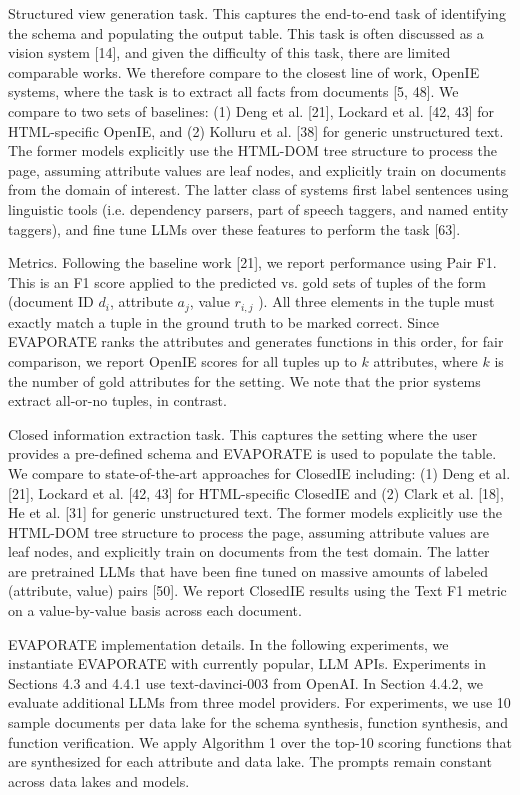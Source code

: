 \documentclass[10pt]{article}
\begin{document}
Structured view generation task. This captures the end-to-end task of identifying the schema and populating the output table. This task is often discussed as a vision system [14], and given the difficulty of this task, there are limited comparable works. We therefore compare to the closest line of work, OpenIE systems, where the task is to extract all facts from documents [5, 48]. We compare to two sets of baselines: (1) Deng et al. [21], Lockard et al. [42, 43] for HTML-specific OpenIE, and (2) Kolluru et al. [38] for generic unstructured text. The former models explicitly use the HTML-DOM tree structure to process the page, assuming attribute values are leaf nodes, and explicitly train on documents from the domain of interest. The latter class of systems first label sentences using linguistic tools (i.e. dependency parsers, part of speech taggers, and named entity taggers), and fine tune LLMs over these features to perform the task [63].

Metrics. Following the baseline work [21], we report performance using Pair F1. This is an F1 score applied to the predicted vs. gold sets of tuples of the form (document ID $d_{i}$, attribute $a_{j}$, value $r_{i, j}$ ). All three elements in the tuple must exactly match a tuple in the ground truth to be marked correct. Since EVAPORATE ranks the attributes and generates functions in this order, for fair comparison, we report OpenIE scores for all tuples up to $k$ attributes, where $k$ is the number of gold attributes for the setting. We note that the prior systems extract all-or-no tuples, in contrast.

Closed information extraction task. This captures the setting where the user provides a pre-defined schema and EVAPORATE is used to populate the table. We compare to state-of-the-art approaches for ClosedIE including: (1) Deng et al. [21], Lockard et al. [42, 43] for HTML-specific ClosedIE and (2) Clark et al. [18], He et al. [31] for generic unstructured text. The former models explicitly use the HTML-DOM tree structure to process the page, assuming attribute values are leaf nodes, and explicitly train on documents from the test domain. The latter are pretrained LLMs that have been fine tuned on massive amounts of labeled (attribute, value) pairs [50]. We report ClosedIE results using the Text F1 metric on a value-by-value basis across each document.

EVAPORATE implementation details. In the following experiments, we instantiate EVAPORATE with currently popular, LLM APIs. Experiments in Sections 4.3 and 4.4.1 use text-davinci-003 from OpenAI. In Section 4.4.2, we evaluate additional LLMs from three model providers. For experiments, we use 10 sample documents per data lake for the schema synthesis, function synthesis, and function verification. We apply Algorithm 1 over the top-10 scoring functions that are synthesized for each attribute and data lake. The prompts remain constant across data lakes and models.
\end{document}
